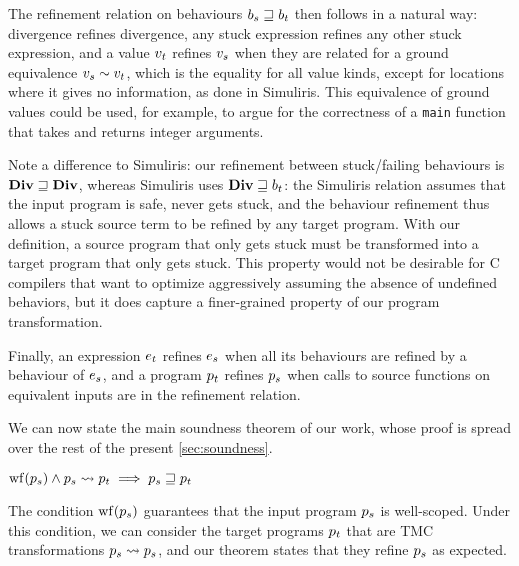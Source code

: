 The refinement relation on behaviours $b_s \sqsupseteq b_t$ then follows in a natural way: divergence refines divergence, any stuck expression refines any other stuck expression, and a value $\datalangVal_t$ refines $\datalangVal_s$ when they are related for a ground equivalence $\datalangVal_s \similar \datalangVal_t$, which is the equality for all value kinds, except for locations where it gives no information, as done in Simuliris.
%
This equivalence of ground values could be used, for example, to argue for the correctness of a \texttt{main} function that takes and returns integer arguments.

Note a difference to Simuliris: our refinement between stuck/failing behaviours is $\constr{Div} \refined \constr{Div}$, whereas Simuliris uses $\constr{Div} \refined b_t$: the Simuliris relation assumes that the input program is safe, never gets stuck, and the behaviour refinement thus allows a stuck source term to be refined by any target program. With our definition, a source program that only gets stuck must be transformed into a target program that only gets stuck.
%
This property would not be desirable for C compilers that want to optimize aggressively assuming the absence of undefined behaviors, but it does capture a finer-grained property of our program transformation.

Finally, an expression $\datalangExpr_t$ refines $\datalangExpr_s$ when all its behaviours are refined by a behaviour of $\datalangExpr_s$, and a program $\datalangProg_t$ refines $\datalangProg_s$ when calls to source functions on equivalent inputs are in the refinement relation.




We can now state the main soundness theorem of our work, whose proof is spread over the rest of the present \cref{sec:soundness}.

\begin{theorem}[Soundness]
    $
        \wf{\datalangProg_s} \wedge \datalangProg_s \tmc \datalangProg_t \implies
        \datalangProg_s \refined \datalangProg_t
    $
\end{theorem}

The condition $\wf{\datalangProg_s}$ guarantees that the input program $\datalangProg_s$ is well-scoped. Under this condition, we can consider the target programs $\datalangProg_t$ that are TMC transformations $\datalangProg_s \tmc \datalangProg_s$, and our theorem states that they refine $\datalangProg_s$ as expected.

